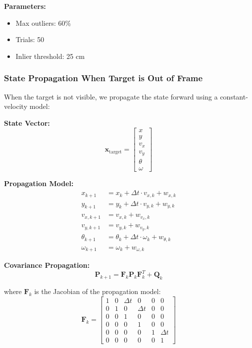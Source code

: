 \documentclass[11pt]{article}
\begin{document}
\textbf{Parameters:}
\begin{itemize}
    \item Max outliers: 60\%
    \item Trials: 50
    \item Inlier threshold: 25 cm
\end{itemize}

\subsubsection{State Propagation When Target is Out of Frame}

When the target is not visible, we propagate the state forward using a constant-velocity model:

\textbf{State Vector:}
\[
\mathbf{x}_{\text{target}} = \begin{bmatrix} x \\ y \\ v_x \\ v_y \\ \theta \\ \omega \end{bmatrix}
\]

\textbf{Propagation Model:}
\begin{align}
x_{k+1} &= x_k + \Delta t \cdot v_{x,k} + w_{x,k} \\
y_{k+1} &= y_k + \Delta t \cdot v_{y,k} + w_{y,k} \\
v_{x,k+1} &= v_{x,k} + w_{v_x,k} \\
v_{y,k+1} &= v_{y,k} + w_{v_y,k} \\
\theta_{k+1} &= \theta_k + \Delta t \cdot \omega_k + w_{\theta,k} \\
\omega_{k+1} &= \omega_k + w_{\omega,k}
\end{align}

\textbf{Covariance Propagation:}
\[
\mathbf{P}_{k+1} = \mathbf{F}_k \mathbf{P}_k \mathbf{F}_k^T + \mathbf{Q}_k
\]

where $\mathbf{F}_k$ is the Jacobian of the propagation model:
\[
\mathbf{F}_k = \begin{bmatrix}
1 & 0 & \Delta t & 0 & 0 & 0 \\
0 & 1 & 0 & \Delta t & 0 & 0 \\
0 & 0 & 1 & 0 & 0 & 0 \\
0 & 0 & 0 & 1 & 0 & 0 \\
0 & 0 & 0 & 0 & 1 & \Delta t \\
0 & 0 & 0 & 0 & 0 & 1
\end{bmatrix}
\]
\end{document}
